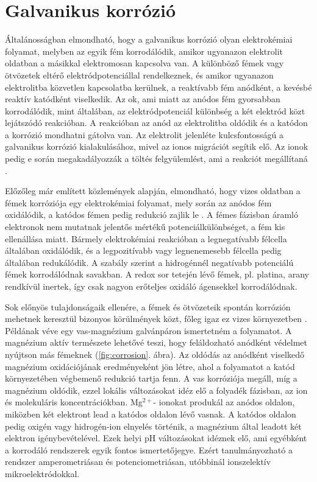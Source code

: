 \section{Galvanikus korrózió}

Általánosságban elmondható, hogy a galvanikus korrózió olyan elektrokémiai folyamat, melyben az egyik fém korrodálódik, amikor ugyanazon elektrolit oldatban a másikkal elektromosan kapcsolva van. A különböző fémek vagy ötvözetek eltérő elektródpotenciállal rendelkeznek, és amikor ugyanazon elektrolitba közvetlen kapcsolatba kerülnek, a reaktívabb fém anódként, a kevésbé reaktív katódként viselkedik. Az ok, ami miatt az anódos fém gyorsabban korrodálódik, mint általában, az elektródpotenciál különbség a két elektród közt lejátszódó reakcióban. A reakcióban az anód az elektrolitba oldódik és a katódon a korrózió mondhatni gátolva van. Az elektrolit jelenléte kulcsfontosságú a galvanikus korrózió kialakulásához, mivel az ionos migrációt segítik elő. Az ionok pedig e során megakadályozzák a töltés felgyülemlést, ami a reakciót megállítaná \cite{fontana2018corrosion}. 

Előzőleg már említett közlemények alapján, elmondható, hogy vizes oldatban a fémek korróziója egy elektrokémiai folyamat, mely során az anódos fém oxidálódik, a katódos fémen pedig redukció zajlik le \cite{isaacs1981scanning}. A fémes fázisban áramló elektronok nem mutatnak jelentős mértékű potenciálkülönbséget, a fém kis ellenállása miatt. Bármely elektrokémiai reakcióban a legnegatívabb félcella általában oxidálódik, és a legpozitívabb vagy legnenemesebb félcella pedig általában redukálódik. A szabály szerint a hidrogénnél negatívabb potenciálú fémek korrodálódnak savakban. A redox sor tetején lévő fémek, pl. platina, arany rendkívül inertek, így csak nagyon erőteljes oxidáló ágensekkel korrodálódnak. 

Sok előnyös tulajdonságaik ellenére, a fémek és ötvözeteik spontán korrózión mehetnek keresztül bizonyos körülmények közt, főleg igaz ez vizes környezetben \cite{izquierdo2013potentiometric}. Példának véve egy vas-magnézium galvánpáron ismertetném a folyamatot. A magnézium aktív természete lehetővé teszi, hogy feláldozható anódként védelmet nyújtson más fémeknek (\ref{fig:corrosion}. ábra). Az oldódás az anódként viselkedő magnézium oxidációjának eredményeként jön létre, ahol a folyamatot a katód környezetében végbemenő redukció tartja fenn. A vas korróziója megáll, míg a magnézium oldódik, ezzel lokális változásokat idéz elő a folyadék fázisban, az ion és molekuláris koncentrációkban. Mg$^{2+}$- ionokat produkál az anódos oldalon, miközben két elektront lead a katódos oldalon lévő vasnak. A katódos oldalon pedig oxigén vagy hidrogén-ion elnyelés történik, a magnézium által leadott két elektron igénybevételével. Ezek helyi pH változásokat idéznek elő, ami egyébként a korrodáló rendszerek egyik fontos ismertetőjegye. Ezért tanulmányozható a rendszer amperometriásan és potenciometriásan, utóbbinál ionszelektív mikroelektródokkal.

